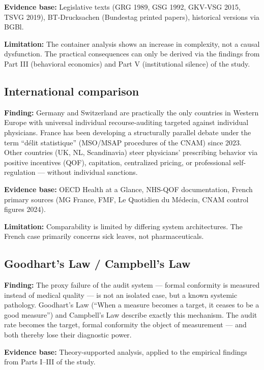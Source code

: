 \documentclass{umbruch-position}
\begin{document}
\textbf{Evidence base:} Legislative texts (GRG 1989, GSG 1992, GKV-VSG 2015, TSVG 2019), BT-Drucksachen (Bundestag printed papers), historical versions via BGBl.

\textbf{Limitation:} The container analysis shows an increase in complexity, not a causal dysfunction. The practical consequences can only be derived via the findings from Part III (behavioral economics) and Part V (institutional silence) of the study.

\subsection{International comparison}

\textbf{Finding:} Germany and Switzerland are practically the only countries in Western Europe with universal individual recourse-auditing targeted against individual physicians. France has been developing a structurally parallel debate under the term ``d\'elit statistique'' (MSO/MSAP procedures of the CNAM) since 2023. Other countries (UK, NL, Scandinavia) steer physicians' prescribing behavior via positive incentives (QOF), capitation, centralized pricing, or professional self-regulation --- without individual sanctions.

\textbf{Evidence base:} OECD Health at a Glance, NHS-QOF documentation, French primary sources (MG France, FMF, Le Quotidien du M\'edecin, CNAM control figures 2024).

\textbf{Limitation:} Comparability is limited by differing system architectures. The French case primarily concerns sick leaves, not pharmaceuticals.

\subsection{Goodhart's Law / Campbell's Law}

\textbf{Finding:} The proxy failure of the audit system --- formal conformity is measured instead of medical quality --- is not an isolated case, but a known systemic pathology. Goodhart's Law (``When a measure becomes a target, it ceases to be a good measure'') and Campbell's Law describe exactly this mechanism. The audit rate becomes the target, formal conformity the object of measurement --- and both thereby lose their diagnostic power.

\textbf{Evidence base:} Theory-supported analysis, applied to the empirical findings from Parts I--III of the study.
\end{document}
